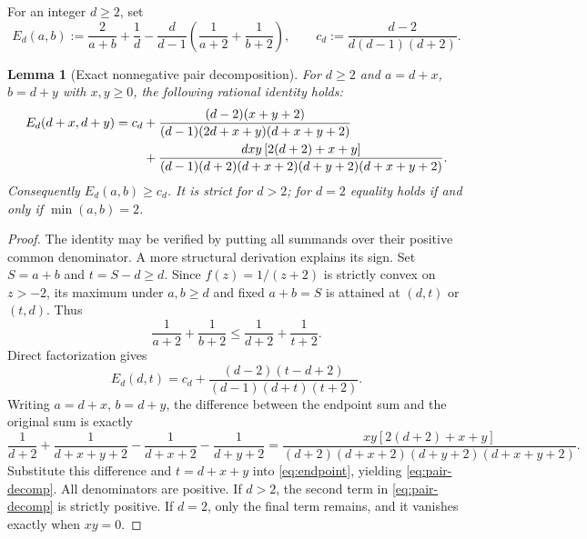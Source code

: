 \documentclass[11pt,a4paper]{article}
\newtheorem{lemma}[theorem]{Lemma}
\theoremstyle{remark}
\begin{document}
For an integer $d\ge2$, set
\begin{equation}\label{eq:E}
 E_d(a,b):=\frac2{a+b}+\frac1d-\frac{d}{d-1}\left(\frac1{a+2}+\frac1{b+2}\right),\qquad
 c_d:=\frac{d-2}{d(d-1)(d+2)}.
\end{equation}

\begin{lemma}[Exact nonnegative pair decomposition]\label{lem:pair}
For $d\ge2$ and $a=d+x$, $b=d+y$ with $x,y\ge0$, the following rational identity holds:
\begin{align}\label{eq:pair-decomp}
 E_d(d+x,d+y)=c_d
 &+\frac{(d-2)(x+y+2)}{(d-1)(2d+x+y)(d+x+y+2)}\\
 &+\frac{dxy\,[2(d+2)+x+y]}{(d-1)(d+2)(d+x+2)(d+y+2)(d+x+y+2)}.\notag
\end{align}
Consequently $E_d(a,b)\ge c_d$. It is strict for $d>2$; for $d=2$ equality holds if and only if $\min(a,b)=2$.
\end{lemma}
\begin{proof}
The identity may be verified by putting all summands over their positive common denominator. A more structural derivation explains its sign. Set $S=a+b$ and $t=S-d\ge d$. Since $f(z)=1/(z+2)$ is strictly convex on $z>-2$, its maximum under $a,b\ge d$ and fixed $a+b=S$ is attained at $(d,t)$ or $(t,d)$. Thus
\[
 \frac1{a+2}+\frac1{b+2}\le\frac1{d+2}+\frac1{t+2}.
\]
Direct factorization gives
\begin{equation}\label{eq:endpoint}
 E_d(d,t)=c_d+\frac{(d-2)(t-d+2)}{(d-1)(d+t)(t+2)}.
\end{equation}
Writing $a=d+x$, $b=d+y$, the difference between the endpoint sum and the original sum is exactly
\[
 \frac1{d+2}+\frac1{d+x+y+2}-\frac1{d+x+2}-\frac1{d+y+2}
 =\frac{xy[2(d+2)+x+y]}{(d+2)(d+x+2)(d+y+2)(d+x+y+2)}.
\]
Substitute this difference and $t=d+x+y$ into \eqref{eq:endpoint}, yielding \eqref{eq:pair-decomp}. All denominators are positive. If $d>2$, the second term in \eqref{eq:pair-decomp} is strictly positive. If $d=2$, only the final term remains, and it vanishes exactly when $xy=0$.
\end{proof}
\end{document}
